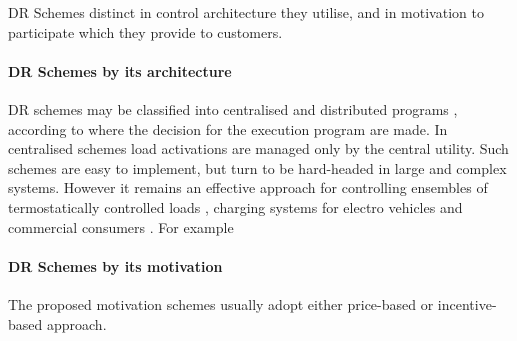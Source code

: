 DR Schemes distinct in control architecture they utilise, and in motivation to participate which they provide to customers.

\paragraph{DR Schemes by its architecture} DR schemes may be classified into centralised and distributed programs \cite{Zhou2012}, according to where the decision for the execution program are made. In centralised schemes load activations are managed only by the central utility. Such schemes are easy to implement, but turn to be hard-headed in large and complex systems. However it remains an effective approach for controlling ensembles of termostatically controlled loads \cite{Hao2015}, charging systems for electro vehicles \cite{Yano2012} and commercial consumers \cite{Motegi2007}. For example 


\paragraph{DR Schemes by its motivation}
The proposed motivation schemes usually adopt either price-based or incentive-based approach. 



